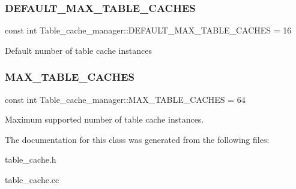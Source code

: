 \subsubsection{\texorpdfstring{D\+E\+F\+A\+U\+L\+T\+\_\+\+M\+A\+X\+\_\+\+T\+A\+B\+L\+E\+\_\+\+C\+A\+C\+H\+ES}{DEFAULT\_MAX\_TABLE\_CACHES}}
{\footnotesize\ttfamily const int Table\+\_\+cache\+\_\+manager\+::\+D\+E\+F\+A\+U\+L\+T\+\_\+\+M\+A\+X\+\_\+\+T\+A\+B\+L\+E\+\_\+\+C\+A\+C\+H\+ES = 16\hspace{0.3cm}{\ttfamily [static]}}

Default number of table cache instances \mbox{\label{classTable__cache__manager_aa581393c5c20169a39b39d9bf3085390}} 
\subsubsection{\texorpdfstring{M\+A\+X\+\_\+\+T\+A\+B\+L\+E\+\_\+\+C\+A\+C\+H\+ES}{MAX\_TABLE\_CACHES}}
{\footnotesize\ttfamily const int Table\+\_\+cache\+\_\+manager\+::\+M\+A\+X\+\_\+\+T\+A\+B\+L\+E\+\_\+\+C\+A\+C\+H\+ES = 64\hspace{0.3cm}{\ttfamily [static]}}

Maximum supported number of table cache instances. 

The documentation for this class was generated from the following files\+:\begin{DoxyCompactItemize}
\item 
table\+\_\+cache.\+h\item 
table\+\_\+cache.\+cc\end{DoxyCompactItemize}
